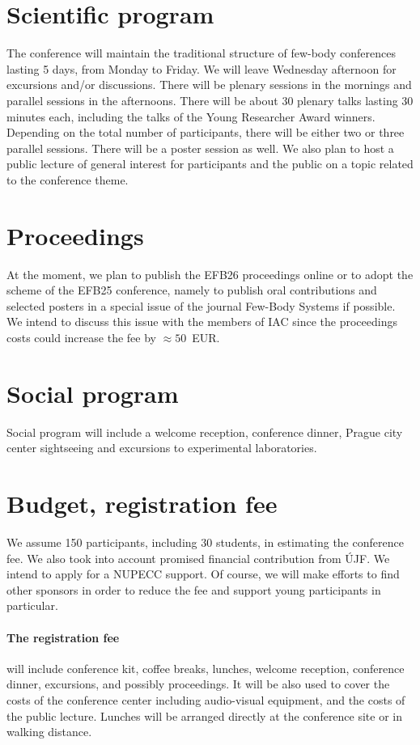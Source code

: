 \documentclass[12pt]{extarticle}
\begin{document}
\section*{Scientific program}
\noindent
The conference will maintain the traditional structure of few-body
conferences lasting 5 days, from Monday to Friday. We will leave
Wednesday afternoon for excursions and/or discussions. There will be
plenary sessions in the mornings and parallel sessions in the
afternoons. There will be about 30 plenary talks lasting 30 minutes
each, including the talks of the Young Researcher Award winners.
Depending on the total number of participants, there will be either
two or three parallel sessions. There will be a poster session as
well. We also plan to host a public lecture of general interest for
participants and the public on a topic related to the conference
theme.

\section*{Proceedings}
\noindent
At the moment, we plan to publish the EFB26 proceedings online or to
adopt the scheme of the EFB25 conference, namely to publish oral
contributions and selected posters in a special issue of the journal
Few-Body Systems if possible. We intend to discuss this issue with the
members of IAC since the proceedings costs could increase the fee by
\(\approx 50\)~EUR.

\section*{Social program}
\noindent
Social program will include a welcome reception, conference dinner,
Prague city center sightseeing and excursions to experimental
laboratories.

\section*{Budget, registration fee}
\noindent
We assume 150 participants, including 30 students, in estimating the
conference fee. We also took into account promised financial
contribution from ÚJF. We intend to apply for a NUPECC support. Of
course, we will make efforts to find other sponsors in order to reduce
the fee and support young participants in particular.

\paragraph{The registration fee} will include conference kit, coffee
breaks, lunches, welcome reception, conference dinner, excursions, and
possibly proceedings. It will be also used to cover the costs of the
conference center including audio-visual equipment, and the costs of
the public lecture. Lunches will be arranged directly at the
conference site or in walking distance.
\end{document}
